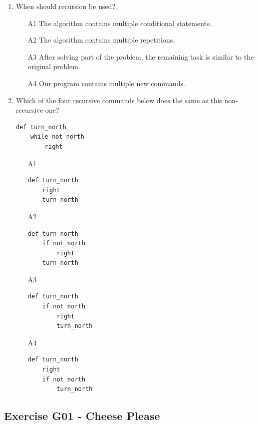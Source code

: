 {{{{\begin{enumerate}
\begin{enumerate}
\end{enumerate}
\item When should recursion be used?
\begin{enumerate}
\item[A1] The algorithm contains multiple conditional statements.
\item[A2] The algorithm contains multiple repetitions.
\item[A3] After solving part of the problem, the remaining task is similar to the original problem.
\item[A4] Our program contains multiple new commands.
\end{enumerate}
\item Which of the four recursive commands below does the same as this non-recursive one?
\begin{verbatim}
def turn_north
    while not north
        right
\end{verbatim}
\begin{enumerate}
\item[A1]
\begin{verbatim}
def turn_north
    right
    turn_north
\end{verbatim}
\item[A2] 
\begin{verbatim}
def turn_north
    if not north
        right
    turn_north
\end{verbatim}
\item[A3] 
\begin{verbatim}
def turn_north
    if not north
        right
        turn_north
\end{verbatim}
\item[A4] 
\begin{verbatim}
def turn_north
    right
    if not north 
        turn_north
\end{verbatim}
\end{enumerate}
\end{enumerate}

\subsection{Exercise G01 - Cheese Please}

}}}}
